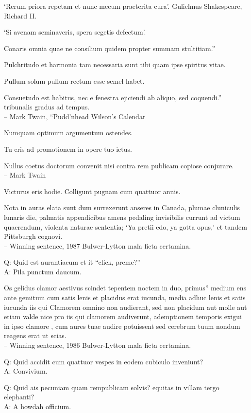 \documentclass[titlepage,12pt]{memoir}
\begin{document}
‘Rerum priora repetam et nunc mecum praeterita cura’.
Gulielmus Shakespeare, Richard II.

‘Si avenam seminaveris, spera segetis defectum’.

Conaris omnia quae ne consilium quidem propter summam stultitiam.”

 Pulchritudo et harmonia tam necessaria sunt tibi quam ipse spiritus vitae.

Pullum solum pullum rectum esse semel habet.

Consuetudo est habitus, nec e fenestra ejiciendi ab aliquo, sed coquendi.”
tribunalis gradus ad tempus.
\\-- Mark Twain, “Pudd’nhead Wilson’s Calendar

Numquam optimum argumentum ostendes.

Tu eris ad promotionem in opere tuo ictus.

Nullus coetus doctorum convenit nisi contra rem publicam copiose conjurare.
\\-- Mark Twain

Victurus eris hodie. Colligunt pugnam cum quattuor annis.

Nota in auras elata sunt dum surrexerunt anseres in Canada, plumae
cluniculis lunaris die, palmatis appendicibus amens pedaling invisibilis
currunt ad victum quaerendum, violenta naturae sententia;
‘Ya pretii edo, ya gotta opus,’ et tandem Pittsburgh cognovi.
\\-- Winning sentence, 1987 Bulwer-Lytton mala ficta certamina.

Q: Quid est aurantiacum et it “click, preme?”\\
A: Pila punctum daucum.

Os gelidus clamor aestivus scindet tepentem noctem in duo, primus”
medium ens ante gemitum cum satis lenis et placidus erat
iucunda, media adhuc lenis et satis iucunda iis qui
Clamorem omnino non audierant, sed non placidum aut molle aut etiam valde nice
pro iis qui clamorem audiverunt, ademptionem temporis exigui
in ipso clamore , cum aures tuae audire potuissent
sed cerebrum tuum nondum reagens erat ut scias.
\\-- Winning sentence, 1986 Bulwer-Lytton mala ficta certamina.

Q: Quid accidit cum quattuor vespes in eodem cubiculo inveniunt?\\
A: Convivium.

Q: Quid ais pecuniam quam rempublicam solvis?
equitas in villam tergo elephanti?\\
A: A howdah officium.
\end{document}
